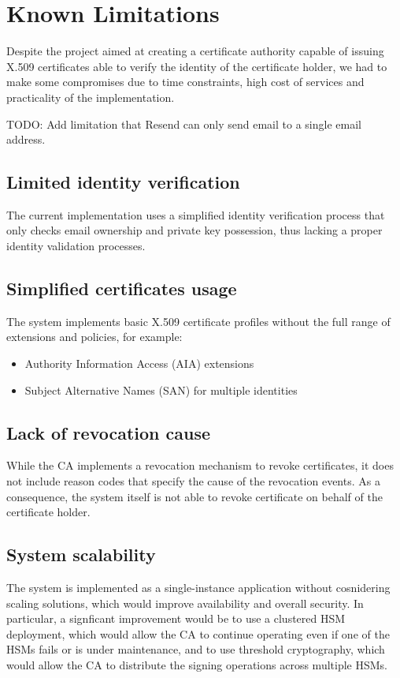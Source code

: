 \chapter{Known Limitations}

Despite the project aimed at creating a certificate authority capable of issuing X.509 certificates 
able to verify the identity of the certificate holder, we had to make some compromises due to time
constraints, high cost of services and practicality of the implementation.

{\color{red}TODO: Add limitation that Resend can only send email to a single email address.}

\section{Limited identity verification}
The current implementation uses a simplified identity verification process
that only checks email ownership and private key possession, thus lacking a proper identity validation
processes.

\section{Simplified certificates usage}

The system implements basic X.509 certificate profiles without the full range 
of extensions and policies, for example:
\begin{itemize}
    \item Authority Information Access (AIA) extensions
    \item Subject Alternative Names (SAN) for multiple identities
\end{itemize}

\section{Lack of revocation cause}

While the CA implements a revocation mechanism to revoke certificates, it does not include
reason codes that specify the cause of the revocation events. As a consequence, the system itself
is not able to revoke certificate on behalf of the certificate holder.

\section{System scalability}

The system is implemented as a single-instance application without cosnidering scaling solutions, which
would improve availability and overall security. In particular, a signficant improvement would be
to use a clustered HSM deployment, which would allow the CA to continue operating even if one of the HSMs
fails or is under maintenance, and to use threshold cryptography, which would allow the CA to distribute
the signing operations across multiple HSMs.

